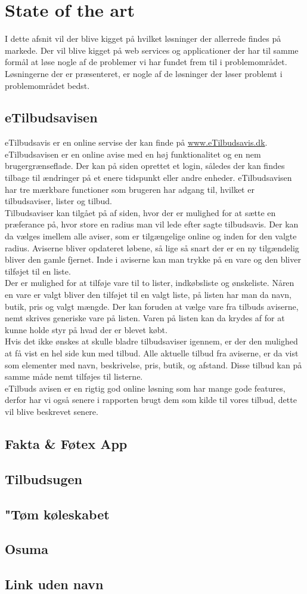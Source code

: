 \chapter{State of the art}
I dette afsnit vil der blive kigget på hvilket løsninger der allerrede findes på markede. Der vil blive kigget på web services og applicationer der har til samme formål at løse nogle af de problemer vi har fundet frem til i problemområdet. Løsningerne der er præsenteret, er nogle af de løsninger der løser problemt i problemområdet bedst. 
\section{eTilbudsavisen}
eTilbudsavis er en online servise der kan finde på \underline{www.eTilbudsavis.dk}. eTilbudsavisen er en online avise med en høj funktionalitet og en nem brugergrænseflade. Der kan på siden oprettet et login, således der kan findes tilbage til ændringer på et enere tidspunkt eller andre enheder. eTilbudsavisen har tre mærkbare functioner som brugeren har adgang til, hvilket er tilbudsaviser, lister og tilbud.\\
Tilbudsaviser kan tilgået på af siden, hvor der er mulighed for at sætte en præferance på, hvor store en radius man vil lede efter sagte tilbudsavis. Der kan da vælges imellem alle aviser, som er tilgængelige online og inden for den valgte radius. Aviserne bliver opdateret løbene, så lige så snart der er en ny tilgændelig bliver den gamle fjernet. Inde i aviserne kan man trykke på en vare og den bliver tilføjet til en liste.\\
Der er mulighed for at tilføje vare til to lister, indkøbsliste og ønskeliste. Nåren en vare er valgt bliver den tilføjet til en valgt liste, på listen har man da navn, butik, pris og valgt mængde. Der kan foruden at vælge vare fra tilbuds aviserne, nemt skrives generiske vare på listen. Varen på listen kan da krydes af for at kunne holde styr på hvad der er blevet købt.\\ 
Hvis det ikke ønskes at skulle bladre tilbudsaviser igennem, er der den mulighed at få vist en hel side kun med tilbud. Alle aktuelle tilbud fra aviserne, er da vist som elementer med navn, beskrivelse, pris, butik, og afstand. Disse tilbud kan på samme måde nemt tilføjes til listerne.\\
eTilbuds avisen er en rigtig god online løsning som har mange gode features, derfor har vi også senere i rapporten brugt dem som kilde til vores tilbud, dette vil blive beskrevet senere.
\section{Fakta & Føtex App}

\section{Tilbudsugen}

\section{"Tøm køleskabet}

\section{Osuma}

\section{Link uden navn}